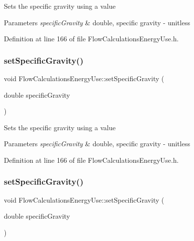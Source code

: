 Sets the specific gravity using a value


\begin{DoxyParams}{Parameters}
{\em specific\+Gravity} & double, specific gravity -\/ unitless \\
\hline
\end{DoxyParams}


Definition at line 166 of file Flow\+Calculations\+Energy\+Use.\+h.

\mbox{\label{class_flow_calculations_energy_use_abafa34d337124a1487fb0c871ea8a24a}} 
\subsubsection{\texorpdfstring{set\+Specific\+Gravity()}{setSpecificGravity()}\hspace{0.1cm}{\footnotesize\ttfamily [2/3]}}
{\footnotesize\ttfamily void Flow\+Calculations\+Energy\+Use\+::set\+Specific\+Gravity (\begin{DoxyParamCaption}\item[{double}]{specific\+Gravity }\end{DoxyParamCaption})\hspace{0.3cm}{\ttfamily [inline]}}

Sets the specific gravity using a value


\begin{DoxyParams}{Parameters}
{\em specific\+Gravity} & double, specific gravity -\/ unitless \\
\hline
\end{DoxyParams}


Definition at line 166 of file Flow\+Calculations\+Energy\+Use.\+h.

\mbox{\label{class_flow_calculations_energy_use_abafa34d337124a1487fb0c871ea8a24a}} 
\subsubsection{\texorpdfstring{set\+Specific\+Gravity()}{setSpecificGravity()}\hspace{0.1cm}{\footnotesize\ttfamily [3/3]}}
{\footnotesize\ttfamily void Flow\+Calculations\+Energy\+Use\+::set\+Specific\+Gravity (\begin{DoxyParamCaption}\item[{double}]{specific\+Gravity }\end{DoxyParamCaption})\hspace{0.3cm}{\ttfamily [inline]}}

